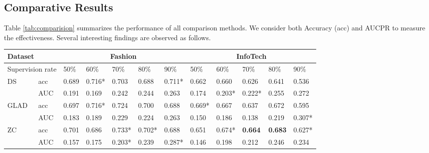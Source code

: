 \subsection{Comparative Results}
Table \ref{tab:comparision} summarizes the performance of all comparison methods. We consider both Accuracy (acc)
and AUCPR to measure the effectiveness. Several interesting findings are observed as follows.
\begin{table*}[!h]
\centering
\begin{tabular}{|l|l|l|l|l|l|l|l|l|l|l|l|}
\hline
\multicolumn{2}{|l|}{Dataset}          & \multicolumn{5}{c|}{Fashion}                                                       & \multicolumn{5}{c|}{InfoTech}                                                            \\ \hline
\multicolumn{2}{|l|}{Supervision rate} & 50\%           & 60\%           & 70\%           & 80\%           & 90\%           & 50\%           & 60\%           & 70\%           & 80\%           & 90\%           \\ \hline
\multirow{2}{*}{DS}          & acc     & 0.689          & 0.716*         & 0.703          & 0.688          & 0.711*         & 0.662          & 0.660          & 0.626          & 0.641          & 0.536          \\ \cline{2-12} 
                             & AUC   & 0.191          & 0.169          & 0.242          & 0.244          & 0.263          & 0.174          & 0.203*         & 0.222*         & 0.255          & 0.272          \\ \hline
\multirow{2}{*}{GLAD}        & acc     & 0.697          & 0.716*         & 0.724          & 0.700          & 0.688          & 0.669*         & 0.667          & 0.637          & 0.672          & 0.595          \\ \cline{2-12} 
                             & AUC   & 0.183          & 0.189          & 0.229          & 0.224          & 0.263          & 0.150          & 0.186          & 0.138          & 0.219          & 0.307*         \\ \hline
ZC                           & acc     & 0.701          & 0.686          & 0.733* & 0.702*         & 0.688          & 0.651          & 0.674*         & \textbf{0.664} & \textbf{0.683} & 0.627*         \\ \cline{2-12} 
                             & AUC   & 0.157          & 0.175          & 0.203*         & 0.239          & 0.287*         & 0.146          & 0.198          & 0.212          & 0.246          & 0.234          \\ \hline

\end{tabular}
\end{table*}
